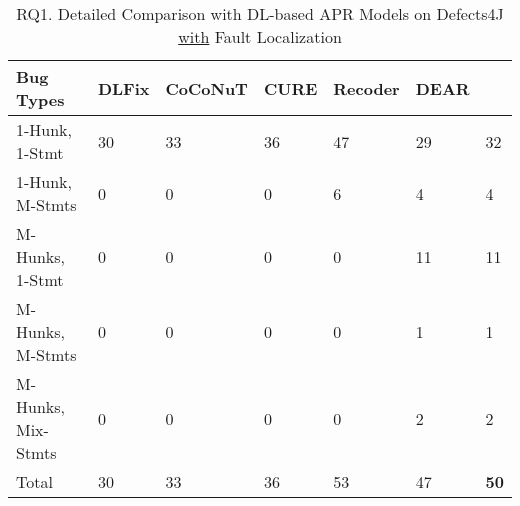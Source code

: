 \begin{table}
	\caption{RQ1. Detailed Comparison with DL-based APR Models on Defects4J \underline{with} Fault Localization}
	\vspace{-10pt}
	\begin{center}
        \small
          \tabcolsep 2pt
		\renewcommand{\arraystretch}{1} 
\begin{tabular}{p{2.5cm}<{\centering}|p{0.8cm}<{\centering}|p{1.2cm}<{\centering}|p{0.7cm}<{\centering}|p{0.9cm}<{\centering}|p{0.8cm}<{\centering}|p{0.8cm}}
			\hline
			Bug Types & DLFix& CoCoNuT & CURE & Recoder & DEAR & {\tool}\\\hline
			
			1-Hunk, 1-Stmt  & 30 & 33 & 36 & 47 & 29 & 32\\
			1-Hunk, M-Stmts  & 0 &0 & 0 & 6 & 4 & 4\\ 
			M-Hunks, 1-Stmt  & 0 &0 & 0 & 0 & 11 &  11\\
			M-Hunks, M-Stmts  & 0 &0 & 0 & 0 & 1 & 1\\
			M-Hunks, Mix-Stmts  & 0 & 0 & 0 & 0 & 2 & 2\\\hline
			Total & 30 & 33 & 36 & 53 & 47 & {\bf 50}\\
			\hline
		\end{tabular}
		\label{multi-tab-with-FL}
	\end{center}
\vspace{-3pt}
\end{table}
















